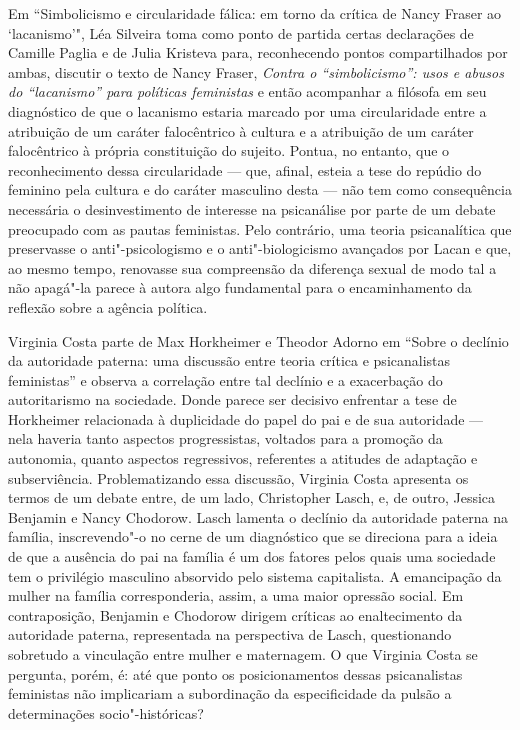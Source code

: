 Em ``Simbolicismo e circularidade fálica: em torno da crítica de Nancy
Fraser ao `lacanismo'", Léa Silveira toma como ponto de partida certas
declarações de Camille Paglia e de Julia Kristeva para, reconhecendo
pontos compartilhados por ambas, discutir o texto de Nancy Fraser,
\emph{Contra o ``simbolicismo'': usos e abusos do ``lacanismo'' para
políticas feministas} e então acompanhar a filósofa em seu diagnóstico
de que o lacanismo estaria marcado por uma circularidade entre a
atribuição de um caráter falocêntrico à cultura e a atribuição de um
caráter falocêntrico à própria constituição do sujeito. Pontua, no
entanto, que o reconhecimento dessa circularidade --- que, afinal, esteia
a tese do repúdio do feminino pela cultura e do caráter masculino desta
--- não tem como consequência necessária o desinvestimento de interesse
na psicanálise por parte de um debate preocupado com as pautas
feministas. Pelo contrário, uma teoria psicanalítica que preservasse o
anti"-psicologismo e o anti"-biologicismo avançados por Lacan e que, ao
mesmo tempo, renovasse sua compreensão da diferença sexual de modo tal a
não apagá"-la parece à autora algo fundamental para o encaminhamento da
reflexão sobre a agência política.

Virginia Costa parte de Max Horkheimer e Theodor Adorno em ``Sobre o declínio da
autoridade paterna: uma discussão entre teoria crítica e psicanalistas
feministas'' e observa a correlação entre tal declínio e a exacerbação
do autoritarismo na sociedade. Donde parece ser decisivo enfrentar a
tese de Horkheimer relacionada à duplicidade do papel do pai e de sua
autoridade --- nela haveria tanto aspectos progressistas, voltados para a
promoção da autonomia, quanto aspectos regressivos, referentes a
atitudes de adaptação e subserviência. Problematizando essa discussão,
Virginia Costa apresenta os termos de um debate entre, de um lado, Christopher
Lasch, e, de outro, Jessica Benjamin e Nancy Chodorow. Lasch lamenta o declínio
da autoridade paterna na família, inscrevendo"-o no cerne de um
diagnóstico que se direciona para a ideia de que a ausência do pai na
família é um dos fatores pelos quais uma sociedade tem o privilégio
masculino absorvido pelo sistema capitalista. A emancipação da mulher na
família corresponderia, assim, a uma maior opressão social. Em
contraposição, Benjamin e Chodorow dirigem críticas ao enaltecimento da
autoridade paterna, representada na perspectiva de Lasch, questionando
sobretudo a vinculação entre mulher e maternagem. O que Virginia Costa
se pergunta, porém, é: até que ponto os posicionamentos dessas
psicanalistas feministas não implicariam a subordinação da
especificidade da pulsão a determinações socio"-históricas?

